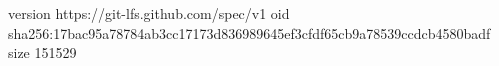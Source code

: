 version https://git-lfs.github.com/spec/v1
oid sha256:17bac95a78784ab3cc17173d836989645ef3cfdf65cb9a78539ccdcb4580badf
size 151529
